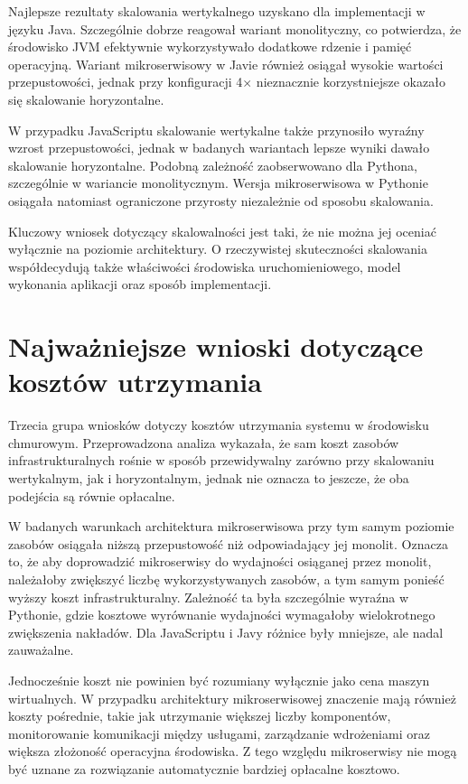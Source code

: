 Najlepsze rezultaty skalowania wertykalnego uzyskano dla implementacji w języku Java. Szczególnie dobrze reagował wariant monolityczny, co potwierdza, że środowisko JVM efektywnie wykorzystywało dodatkowe rdzenie i pamięć operacyjną. Wariant mikroserwisowy w Javie również osiągał wysokie wartości przepustowości, jednak przy konfiguracji 4$\times$ nieznacznie korzystniejsze okazało się skalowanie horyzontalne.

W przypadku JavaScriptu skalowanie wertykalne także przynosiło wyraźny wzrost przepustowości, jednak w badanych wariantach lepsze wyniki dawało skalowanie horyzontalne. Podobną zależność zaobserwowano dla Pythona, szczególnie w wariancie monolitycznym. Wersja mikroserwisowa w Pythonie osiągała natomiast ograniczone przyrosty niezależnie od sposobu skalowania.

Kluczowy wniosek dotyczący skalowalności jest taki, że nie można jej oceniać wyłącznie na poziomie architektury. O rzeczywistej skuteczności skalowania współdecydują także właściwości środowiska uruchomieniowego, model wykonania aplikacji oraz sposób implementacji.

\section{Najważniejsze wnioski dotyczące kosztów utrzymania}

Trzecia grupa wniosków dotyczy kosztów utrzymania systemu w środowisku chmurowym. Przeprowadzona analiza wykazała, że sam koszt zasobów infrastrukturalnych rośnie w sposób przewidywalny zarówno przy skalowaniu wertykalnym, jak i horyzontalnym, jednak nie oznacza to jeszcze, że oba podejścia są równie opłacalne.

W badanych warunkach architektura mikroserwisowa przy tym samym poziomie zasobów osiągała niższą przepustowość niż odpowiadający jej monolit. Oznacza to, że aby doprowadzić mikroserwisy do wydajności osiąganej przez monolit, należałoby zwiększyć liczbę wykorzystywanych zasobów, a tym samym ponieść wyższy koszt infrastrukturalny. Zależność ta była szczególnie wyraźna w Pythonie, gdzie kosztowe wyrównanie wydajności wymagałoby wielokrotnego zwiększenia nakładów. Dla JavaScriptu i Javy różnice były mniejsze, ale nadal zauważalne.

Jednocześnie koszt nie powinien być rozumiany wyłącznie jako cena maszyn wirtualnych. W przypadku architektury mikroserwisowej znaczenie mają również koszty pośrednie, takie jak utrzymanie większej liczby komponentów, monitorowanie komunikacji między usługami, zarządzanie wdrożeniami oraz większa złożoność operacyjna środowiska. Z tego względu mikroserwisy nie mogą być uznane za rozwiązanie automatycznie bardziej opłacalne kosztowo.

